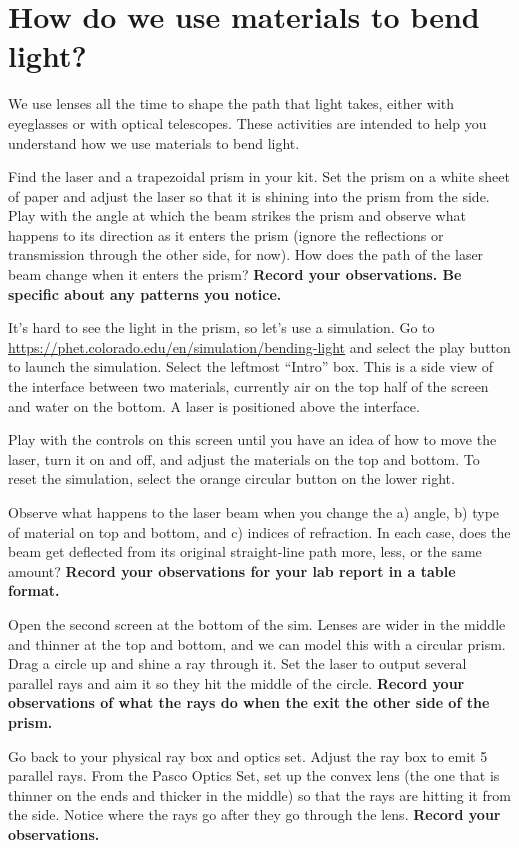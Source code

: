 \section{How do we use materials to bend light?}

We use lenses all the time to shape the path that light takes, either with eyeglasses or with optical telescopes. These activities are intended to help you understand how we use materials to bend light.

\begin{steps}
	\item Find the laser and a trapezoidal prism in your kit. Set the prism on a white sheet of paper and adjust the laser so that it is shining into the prism from the side. Play with the angle at which the beam strikes the prism and observe what happens to its direction as it enters the prism (ignore the reflections or transmission through the other side, for now). How does the path of the laser beam change when it enters the prism? \textbf{Record your observations. Be specific about any patterns you notice.}
	
	\item It's hard to see the light in the prism, so let's use a simulation. Go to \url{https://phet.colorado.edu/en/simulation/bending-light} and select the play button to launch the simulation. Select the leftmost ``Intro'' box. This is a side view of the interface between two materials, currently air on the top half of the screen and water on the bottom. A laser is positioned above the interface.
	
	\item Play with the controls on this screen until you have an idea of how to move the laser, turn it on and off, and adjust the materials on the top and bottom. To reset the simulation, select the orange circular button on the lower right.
	
	\item Observe what happens to the laser beam when you change the a) angle, b) type of material on top and bottom, and c) indices of refraction. In each case, does the beam get deflected from its original straight-line path more, less, or the same amount? \textbf{Record your observations for your lab report in a table format.}

	\item Open the second screen at the bottom of the sim. Lenses are wider in the middle and thinner at the top and bottom, and we can model this with a circular prism. Drag a circle up and shine a ray through it. Set the laser to output several parallel rays and aim it so they hit the middle of the circle. \textbf{Record your observations of what the rays do when the exit the other side of the prism.}
	
	\item Go back to your physical ray box and optics set. Adjust the ray box to emit 5 parallel rays. From the Pasco Optics Set, set up the convex lens (the one that is thinner on the ends and thicker in the middle) so that the rays are hitting it from the side. Notice where the rays go after they go through the lens. \textbf{Record your observations.}
\end{steps}

